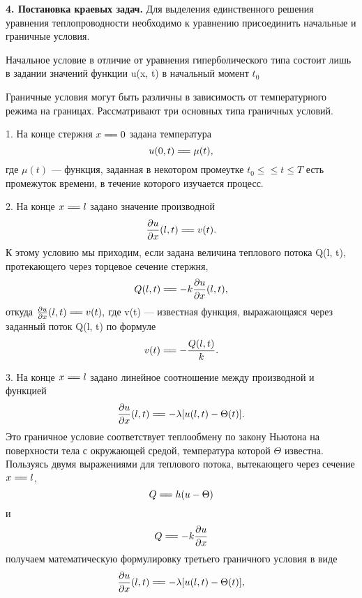 \documentclass{article}
\begin{document}
\begin{flushleft}
\textbf{4. Постановка краевых задач.} Для выделения единственного решения уравнения теплопроводности необходимо к уравнению присоединить начальные и граничные условия.


\parindent=0.5cm
Начальное условие в отличие от уравнения гиперболического типа состоит лишь в задании значений функции u(x, t)  в начальный момент $t_0$

\parindent=0.5cm
Граничные условия могут быть различны в зависимость от температурного режима на границах. Рассматривают три основных типа граничных условий.

\parindent=0.5cm
1. На конце стержня $x =\joinrel=  0$ задана температура
$$u(0, t) =\joinrel= \mu (t),$$
где $\mu (t)$ --- функция, заданная в некотором промеутке $t_0 \leq\leqslant t \leq T $ есть промежуток времени, в течение которого изучается процесс. 

\parindent=0.5cm
2. На конце $x =\joinrel=  l$ задано значение производной
$$\frac{\partial u}{\partial x}(l, t) =\joinrel= v(t).$$
К этому условию мы приходим, если задана величина теплового потока Q(l, t), протекающего через торцевое сечение стержня, 
$$Q(l, t) =\joinrel= -k\frac{\partial u}{\partial x}(l, t),$$
откуда $\frac{\partial u}{\partial x}(l, t) =\joinrel= v(t),$ где v(t) --- известная функция, выражающаяся через заданный поток Q(l, t) по формуле
$$v(t) =\joinrel= -\frac{Q(l, t)}{k}.$$

\parindent=0.5cm
3. На конце $x =\joinrel=  l$ задано линейное соотношение между производной и функцией
$$ \frac{\partial u}{\partial x}(l, t) =\joinrel= - \lambda[u(l, t) - \Theta(t)].$$
Это граничное условие соответствует теплообмену по закону Ньютона на поверхности тела с окружающей средой, температура которой $\Theta$  известна. Пользуясь двумя выражениями для теплового потока, вытекающего через сечение $x =\joinrel=  l$,
$$Q =\joinrel= h(u - \Theta)$$
и 
$$Q =\joinrel= -k\frac{\partial u}{\partial x}$$
получаем математическую формулировку третьего граничного условия в виде 
$$ \frac{\partial u}{\partial x}(l, t) =\joinrel= - \lambda[u(l, t) - \Theta(t)],$$




\end{flushleft}
\end{document}
